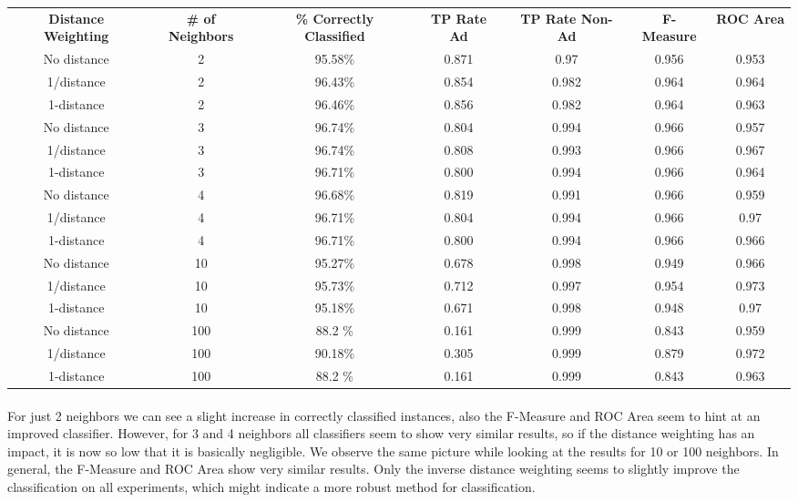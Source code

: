 \documentclass{article}
\begin{document}
\begin{tabular}{c | c | c | c | c | c | c}
\textbf{Distance Weighting} & \textbf{\# of Neighbors} & \textbf{\% Correctly Classified} & \textbf{TP Rate Ad} & \textbf{TP Rate Non-Ad} & \textbf{F-Measure} & \textbf{ROC Area}\\
No distance & 2   & 95.58\% & 0.871 & 0.97  & 0.956 & 0.953\\
1/distance  & 2   & 96.43\% & 0.854 & 0.982 & 0.964 & 0.964\\
1-distance  & 2   & 96.46\% & 0.856 & 0.982 & 0.964 & 0.963\\
No distance & 3   & 96.74\% & 0.804 & 0.994 & 0.966 & 0.957\\
1/distance  & 3   & 96.74\% & 0.808 & 0.993 & 0.966 & 0.967\\
1-distance  & 3   & 96.71\% & 0.800 & 0.994 & 0.966 & 0.964\\
No distance & 4   & 96.68\% & 0.819 & 0.991 & 0.966 & 0.959\\
1/distance  & 4   & 96.71\% & 0.804 & 0.994 & 0.966 & 0.97\\
1-distance  & 4   & 96.71\% & 0.800 & 0.994 & 0.966 & 0.966\\
No distance & 10  & 95.27\% & 0.678 & 0.998 & 0.949 & 0.966\\
1/distance  & 10  & 95.73\% & 0.712 & 0.997 & 0.954 & 0.973\\
1-distance  & 10  & 95.18\% & 0.671 & 0.998 & 0.948 & 0.97\\
No distance & 100 & 88.2 \% & 0.161 & 0.999 & 0.843 & 0.959\\
1/distance  & 100 & 90.18\% & 0.305 & 0.999 & 0.879 & 0.972\\
1-distance  & 100 & 88.2 \% & 0.161 & 0.999 & 0.843 & 0.963\\
\end{tabular}

\paragraph{}For just 2 neighbors we can see a slight increase in correctly classified instances, also the F-Measure and ROC Area seem to hint at an improved classifier. However, for 3 and 4 neighbors all classifiers seem to show very similar results, so if the distance weighting has an impact, it is now so low that it is basically negligible. We observe the same picture while looking at the results for 10 or 100 neighbors. In general, the F-Measure and ROC Area show very similar results. Only the inverse distance weighting seems to slightly improve the classification on all experiments, which might indicate a more robust method for classification. 
\end{document}
